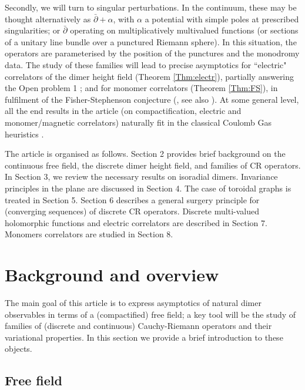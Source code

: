 \documentclass[10pt]{article}
\newcommand{\dbar}{\bar\partial}
\begin{document}
Secondly, we will turn to singular perturbations. In the continuum, these may be thought alternatively as $\dbar+\alpha$, with $\alpha$ a potential with simple poles at prescribed singularities; or $\dbar$ operating on multiplicatively multivalued functions (or sections of a unitary line bundle over a punctured Riemann sphere). In this situation, the operators are parameterised by the position of the punctures and the monodromy data. The study of these families will lead to precise asymptotics for ``electric" correlators of the dimer height field (Theorem \ref{Thm:electr}), partially answering the Open problem 1 \cite{Ken_IAS}; and for monomer correlators (Theorem \ref{Thm:FS}), in fulfilment of the Fisher-Stephenson conjecture (\cite{FisSte2}, see also \cite{Ciucu_PNAS}). At some general level, all the end results in the article (on compactification, electric and monomer/magnetic correlators) naturally fit in the classical Coulomb Gas heuristics \cite{Nien_Coulomb,DiFSalZub_coulomb}.





%
%
%
%
%
%
%
%
%
%
%
%
%
%
%
%
%
%
%
%
%
%
%
%
%
%
%
%
%
%
%
%
%
%
%

The article is organised as follows. Section 2 provides brief background on the continuous free field, the discrete dimer height field, and families of CR operators. In Section 3, we review the necessary results on isoradial dimers. Invariance principles in the plane are discussed in Section 4. The case of toroidal graphs is treated in Section 5. Section 6 describes a general surgery principle for (converging sequences) of discrete CR operators. Discrete multi-valued holomorphic functions and electric correlators are described in Section 7. Monomers correlators are studied in Section 8.



\section{Background and overview}

The main goal of this article is to express asymptotics of natural dimer observables in terms of a (compactified) free field; a key tool will be the study of families of (discrete and continuous) Cauchy-Riemann operators and their variational properties. In this section we provide a brief introduction to these objects.


\subsection{Free field}
\end{document}

